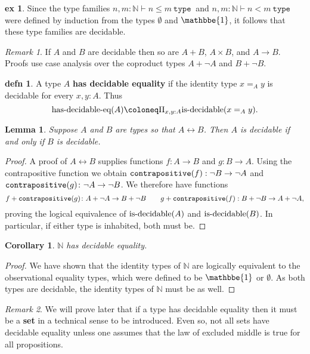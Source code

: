\documentclass{amsart}
\theoremstyle{theorem}
\newtheorem*{lem}{Lemma}
\newtheorem*{cor}{Corollary}
\theoremstyle{definition}
\newtheorem*{defn}{defn}
\newtheorem*{ex}{ex}
\theoremstyle{remark}
\newtheorem*{rmk}{Remark}
\newcommand{\0}{\mathbbe{0}}
\newcommand{\1}{\mathbbe{1}}
\newcommand{\2}{\mathbbe{2}}
\newcommand{\3}{\mathbbe{3}}
\newcommand{\4}{\mathbbe{4}}
\newcommand{\univ}{{~\texttt{type}~}}
\newcommand{\term}[1]{{\textup{\texttt{#1}}}}
\newcommand{\type}[1]{{\textup{#1}}}
\newcommand{\bN}{{\mathbb{N}}}
\begin{document}
\begin{ex} Since the type families $n, m: \bN \vdash n \leq m \univ$ and $n, m : \bN \vdash n < m \univ$ were defined by induction from the types $\emptyset$ and $\1$, it follows that these type families are decidable.
\end{ex}

\begin{rmk}
If $A$ and $B$ are decidable then so are $A+B$, $A \times B$, and $A \to B$. Proofs use case analysis over the coproduct types $A + \neg A$ and $B + \neg B$. 
\end{rmk}

\begin{defn} A type $A$ \textbf{has decidable equality} if the identity type $x=_Ay$ is decidable for every $x, y : A$. Thus
\[ \type{has-decidable-eq}(A) \coloneq \Pi_{x,y: A} \type{is-decidable}(x=_Ay).\]
\end{defn}

\begin{lem} Suppose $A$ and $B$ are types so that $A \leftrightarrow B$. Then $A$ is decidable if and only if $B$ is decidable.
\end{lem}
\begin{proof}
A proof of $A \leftrightarrow B$ supplies functions $f \colon A \to B$ and $g \colon B \to A$. Using the contrapositive function we obtain $\term{contrapositive}(f) : \neg B \to \neg A$ and $\term{contrapositive}(g) \colon \neg A \to \neg B$. We therefore have functions
\[ f + \term{contrapositive}(g) \colon A + \neg A \to B + \neg B \qquad g + \term{contrapositive}(f) : B + \neg B \to A + \neg A,\]
proving the logical equivalence of $\type{is-decidable}(A)$ and $\type{is-decidable}(B)$. In particular, if either type is inhabited, both must be. 
\end{proof}

\begin{cor} $\bN$ has decidable equality.
\end{cor}
\begin{proof}
We have shown that the identity types of $\bN$ are logically equivalent to the observational equality types, which were defined to be $\1$ or $\emptyset$. As both types are decidable, the identity types of $\bN$ must be as well.
\end{proof}

\begin{rmk} We will prove later that if a type has decidable equality then it must be a \textbf{set} in a technical sense to be introduced. Even so, not all sets have decidable equality unless one assumes that the law of excluded middle is true for all propositions.
\end{rmk}
\end{document}
